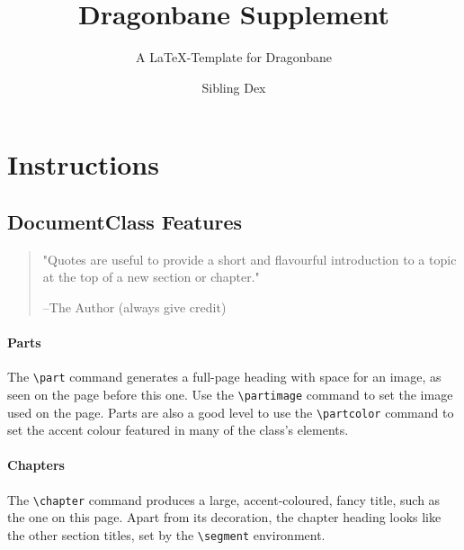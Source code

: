 \documentclass[
]{dragonbane-supplement}
\title{Dragonbane Supplement}
\subtitle{A LaTeX-Template for Dragonbane}
\author{Sibling Dex}
\begin{document}
\maketitle

\part{Instructions}

\chapter{DocumentClass Features}

\begin{segment}

\begin{quote}
    "Quotes are useful to provide a short and flavourful introduction to a topic at the top of a new section or chapter."

    --The Author (always give credit)
\end{quote}

\subsection{Parts}
The \texttt{\textbackslash part} command generates a full-page heading with space for an image, as seen on the page before this one. Use the \texttt{\textbackslash partimage} command to set the image used on the page. Parts are also a good level to use the \texttt{\textbackslash partcolor} command to set the accent colour featured in many of the class's elements.

\subsection{Chapters}
The \texttt{\textbackslash chapter} command produces a large, accent-coloured, fancy title, such as the one on this page. Apart from its decoration, the chapter heading looks like the other section titles, set by the \texttt{\textbackslash segment} environment.
\end{segment}
\end{document}

